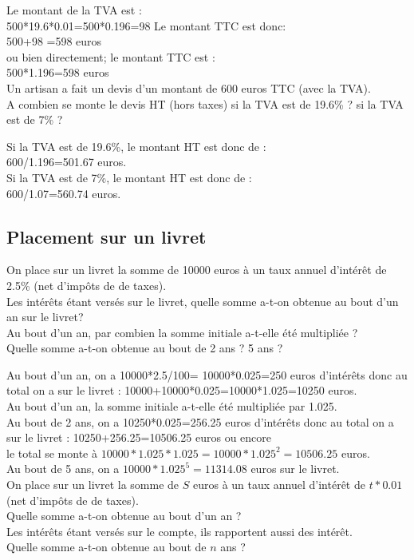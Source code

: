 \documentclass[a4paper,11pt]{book}
\begin{document}
Le montant de la TVA est :\\
500*19.6*0.01=500*0.196=98
Le montant TTC est donc:\\
500+98 =598 euros\\
ou bien directement; le montant TTC est :\\
500*1.196=598 euros\\

Un artisan a fait un devis d'un montant de 600 euros TTC (avec la TVA).\\
A combien se monte le devis HT (hors taxes) si la TVA  est de 19.6\% ?
si la TVA  est de 7\% ?

Si la TVA  est de 19.6\%, le montant HT est donc de :\\
600/1.196=501.67 euros.\\ 
Si la TVA  est de 7\%, le montant HT est donc de :\\
600/1.07=560.74 euros.
\subsection{Placement sur un livret}
On place sur un livret la somme de 10000 euros \`a un taux annuel d'int\'er\^et 
de 2.5\% (net d'imp\^ots de de taxes).\\
Les int\'er\^ets \'etant vers\'es sur le livret, quelle somme a-t-on obtenue au 
bout d'un an sur le livret? \\
Au bout d'un an, par combien la somme initiale a-t-elle \'et\'e multipli\'ee ?\\
Quelle somme a-t-on obtenue au bout de 2 ans ? 5 ans ? 
 
Au bout d'un an, on a  10000*2.5/100= 10000*0.025=250 euros d'int\'er\^ets donc 
au total on a sur le livret : 10000+10000*0.025=10000*1.025=10250 euros.\\
Au bout d'un an, la somme initiale a-t-elle \'et\'e multipli\'ee par 1.025.\\
Au bout de 2 ans, on a  10250*0.025=256.25 euros d'int\'er\^ets donc au total on 
a sur le livret : 10250+256.25=10506.25 euros ou encore \\
le total se monte \`a $10000*1.025*1.025=10000*1.025^2=10506.25$ euros.\\
Au bout de  5 ans, on a  $10000*1.025^5=11314.08$ euros sur le livret.\\
On place sur un livret la somme de $S$ euros \`a un taux annuel d'int\'er\^et 
de $t*0.01$ (net d'imp\^ots de de taxes).\\
Quelle somme a-t-on obtenue au bout d'un an ? \\
Les int\'er\^ets \'etant vers\'es sur le compte, ils rapportent aussi des 
int\'er\^et.\\
Quelle somme a-t-on obtenue au bout de $n$ ans ? \\ 
\end{document}
